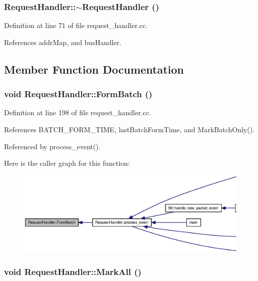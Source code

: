 \subsubsection[{$\sim$RequestHandler}]{\setlength{\rightskip}{0pt plus 5cm}RequestHandler::$\sim$RequestHandler ()}\label{classRequestHandler_33488d8c2fa1f2c15193c9918960171a}




Definition at line 71 of file request\_\-handler.cc.

References addrMap, and busHandler.

\subsection{Member Function Documentation}
\subsubsection[{FormBatch}]{\setlength{\rightskip}{0pt plus 5cm}void RequestHandler::FormBatch ()}\label{classRequestHandler_29361a7a3ef7c32cc94cb954980229a0}




Definition at line 198 of file request\_\-handler.cc.

References BATCH\_\-FORM\_\-TIME, lastBatchFormTime, and MarkBatchOnly().

Referenced by process\_\-event().

Here is the caller graph for this function:\nopagebreak
\begin{figure}[H]
\begin{center}
\leavevmode
\includegraphics[width=420pt]{classRequestHandler_29361a7a3ef7c32cc94cb954980229a0_icgraph}
\end{center}
\end{figure}
\subsubsection[{MarkAll}]{\setlength{\rightskip}{0pt plus 5cm}void RequestHandler::MarkAll ()}\label{classRequestHandler_ebdbb49c40cb699c85f1babb4c88b593}




